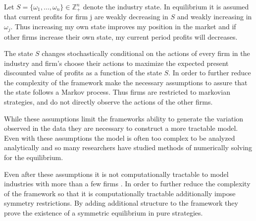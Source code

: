 \documentclass[12pt]{article}
\begin{document}
Let $S=\{\omega_1,\dots,\omega_n\} \in \mathbb{Z}_+^n$ denote the industry state. In equilibrium it is assumed that current profits for firm j are weakly decreasing in $S$ and weakly increasing in $\omega_j$. Thus increasing my own state improves my position in the market and if other firms increase their own state, my current period profits will decreases.

The state $S$ changes stochastically conditional on the actions of every firm in the industry and firm's choose their actions to maximize the expected present discounted value of profits as a function of the state $S$. In order to further reduce the complexity of the framework \citet{1995_Erickson_Pakes_RES} make the necessary assumptions to assure that the state follows a Markov process. Thus firms are restricted to markovian strategies, and do not directly observe the actions of the other firms.


While these assumptions limit the frameworks ability to generate the variation observed in the data they are necessary to construct a more tractable model. Even with these assumptions the model is often too complex to be analyzed analytically and so many researchers have studied methods of numerically solving for the equilibrium.

Even after these assumptions it is not computationally tractable to model industries with more than a few firms \citep{2008_Weintraub_Benkard_VanRoy_Econometrica}.
In order to further reduce the complexity of the framework so that it is computationally tractable \citet{2010_Doraszelski_Satterthwaite_RAND} additionally impose symmetry restrictions. By adding additional structure to the framework they prove the existence of a symmetric equilibrium in pure strategies.
\end{document}
